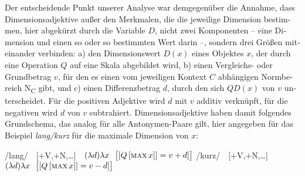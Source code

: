 \documentclass[output=paper,colorlinks,citecolor=brown]{langscibook}
\begin{document}
\begin{otherlanguage}{german}
Der entscheidende Punkt unserer Analyse war demgegenüber die Annahme, dass Dimensionsadjektive außer den Merkmalen, die die jeweilige Dimension bestimmen, hier abgekürzt durch die Variable $D$, nicht zwei Komponenten -- eine Dimension und einen so oder so bestimmten Wert darin --, sondern drei Größen miteinander verbinden: a) den Dimensionswert $D(x)$ eines Objektes $x$, der durch eine Operation $Q$ auf eine Skala abgebildet wird, b) einen Vergleichs- oder Grundbetrag $v$, für den es einen vom jeweiligen Kontext $C$ abhängigen Normbereich N\textsubscript{C} gibt, und c) einen Differenzbetrag $d$, durch den sich $QD(x)$ von $v$ unterscheidet. Für die positiven Adjektive wird $d$ mit $v$ additiv verknüpft, für die negativen wird $d$ von $v$ subtrahiert. Dimensionsadjektive haben damit folgendes Grundschema, das analog für alle Antonymen-Paare gilt, hier angegeben für das Beispiel \textit{lang/kurz} für die maximale Dimension von $x$:

\ea 
\ea /lang/ \,\, [$+$V,$+$N,\dots] \,\, $(\lambda d) \lambda x \,\,\,\, \big\lbrack [ Q\, [ \textsc{max}\, x ]] = v + d ] \big\rbrack$
\label{ex:18a}
\ex /kurz/ \,\, [$+$V,$+$N,\dots] \,\, $(\lambda d) \lambda x \,\,\,\, \big\lbrack [ Q\, [ \textsc{max}\, x ]] = v - d ] \big\rbrack$
\label{ex:18b}
\z
\label{ex:18}
\z


\end{otherlanguage}
\end{document}
